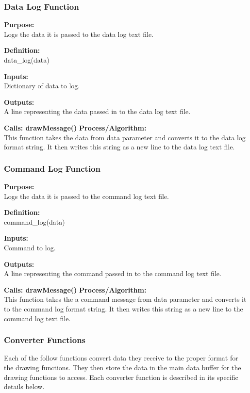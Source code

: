 \documentclass[10pt,draftclsnofoot,onecolumn,compsoc]{IEEEtran}
\begin{document}
\subsubsection{Data Log Function}
{\bf Purpose:} \\
Logs the data it is passed to the data log text file.  \par
{\bf Definition:} \\ 
data\_log(data) \par
{\bf Inputs:} \\ Dictionary of data to log. \par
{\bf Outputs:} \\A line representing the data passed in to the data log text file. \par
{\bf Calls: drawMessage()}
{\bf Process/Algorithm:} \\
This function takes the data from data parameter and converts it to the data log format string. It then writes this string as a new line to the data log text file. \par

\subsubsection{Command Log Function}
{\bf Purpose:} \\
Logs the data it is passed to the command log text file.  \par
{\bf Definition:} \\ 
command\_log(data) \par
{\bf Inputs:} \\ Command to log. \par
{\bf Outputs:} \\A line representing the command passed in to the command log text file. \par
{\bf Calls: drawMessage()}
{\bf Process/Algorithm:} \\
This function takes the a command message from data parameter and converts it to the command log format string. It then writes this string as a new line to the command log text file. \par
\subsubsection{Converter Functions}
Each of the follow functions convert data they receive to the proper format for the drawing functions. They then store the data in the main data buffer for the drawing functions to access.  Each converter function is described in its specific details below. \par
\end{document}
